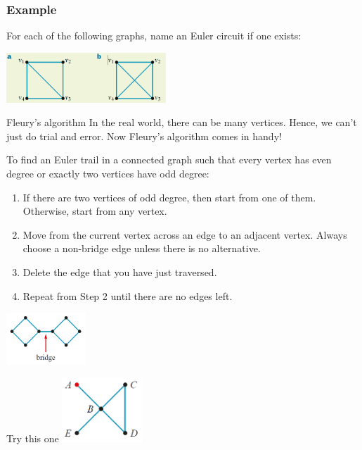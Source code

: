 \documentclass[
	11pt, %
]{beamer}
\begin{document}
\begin{frame}[t]
    \frametitle{Example}
    For each of the following graphs, name an Euler circuit if one exists:
    \begin{center}
        \includegraphics[width = 6cm]{Graph11.png}
    \end{center}
\end{frame}

\begin{frame}{Fleury's algorithm}
    In the real world, there can be many vertices. Hence, we can't just do trial and error. Now Fleury's algorithm comes in handy!\\
    \begin{block}{}
        To find an Euler trail in a connected graph such that every vertex has even degree or exactly two vertices have odd degree:
        \begin{enumerate}
            \item If there are two vertices of odd degree, then start from one of them. Otherwise,
            start from any vertex.
            \item Move from the current vertex across an edge to an adjacent vertex. Always
            choose a non-bridge edge unless there is no alternative.
            \item Delete the edge that you have just traversed.
            \item Repeat from Step 2 until there are no edges left.
        \end{enumerate}
        \begin{center}
            \includegraphics[width = 3cm]{Bridge.png}
        \end{center}
    \end{block}
\end{frame}

\begin{frame}{Try this one}
    \includegraphics[width = 3cm]{Graph12.png}
\end{frame}
\end{document}
